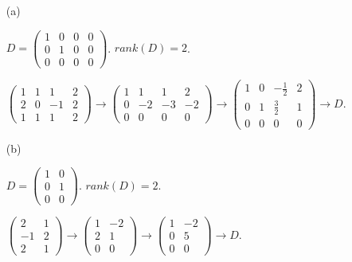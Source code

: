 \begin{Exercise}
\begin{enumerate}[(a)]
\item[(a)]
\begin{answer}
$D = \begin{pmatrix}
1 & 0 & 0 & 0 \\
0 & 1 & 0 & 0 \\
0 & 0 & 0 & 0
\end{pmatrix}$. $rank(D) = 2$.
\end{answer}
\begin{solution}
$\begin{pmatrix}
1 & 1 & 1 & 2 \\
2 & 0 & -1 & 2 \\
1 & 1 & 1 & 2
\end{pmatrix} \longrightarrow \begin{pmatrix}
1 & 1 & 1 & 2 \\
0 & -2 & -3 & -2 \\
0 & 0 & 0 & 0
\end{pmatrix} \longrightarrow \begin{pmatrix}
1 & 0 & -\frac{1}{2} & 2 \\
0 & 1 & \frac{3}{2} & 1 \\
0 & 0 & 0 & 0
\end{pmatrix} \longrightarrow D$.
\end{solution}

\item[(b)]
\begin{answer}
$D = \begin{pmatrix}
1 & 0 \\
0 & 1 \\
0 & 0
\end{pmatrix}$. $rank(D) = 2$.
\end{answer}
\begin{solution}
$\begin{pmatrix}
2 & 1 \\
-1 & 2 \\
2 & 1
\end{pmatrix}  \longrightarrow \begin{pmatrix}
1 & -2 \\
2 & 1 \\
0 & 0
\end{pmatrix} \longrightarrow \begin{pmatrix}
1 & -2 \\
0 & 5 \\
0 & 0
\end{pmatrix} \longrightarrow D$.
\end{solution}

\end{enumerate}
\end{Exercise}